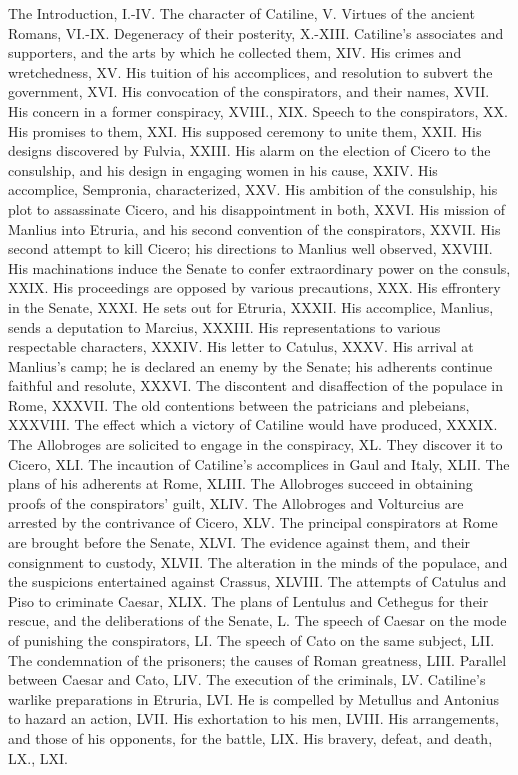 

The Introduction, I.-IV. The character of Catiline, V. Virtues of the
ancient Romans, VI.-IX. Degeneracy of their posterity, X.-XIII.
Catiline's associates and supporters, and the arts by which he
collected them, XIV. His crimes and wretchedness, XV. His tuition of
his accomplices, and resolution to subvert the government, XVI. His
convocation of the conspirators, and their names, XVII. His concern in
a former conspiracy, XVIII., XIX. Speech to the conspirators, XX. His
promises to them, XXI. His supposed ceremony to unite them, XXII. His
designs discovered by Fulvia, XXIII. His alarm on the election of
Cicero to the consulship, and his design in engaging women in his
cause, XXIV. His accomplice, Sempronia, characterized, XXV. His
ambition of the consulship, his plot to assassinate Cicero, and his
disappointment in both, XXVI. His mission of Manlius into Etruria, and
his second convention of the conspirators, XXVII. His second attempt
to kill Cicero; his directions to Manlius well observed, XXVIII. His
machinations induce the Senate to confer extraordinary power on the
consuls, XXIX. His proceedings are opposed by various precautions,
XXX. His effrontery in the Senate, XXXI. He sets out for Etruria,
XXXII. His accomplice, Manlius, sends a deputation to Marcius, XXXIII.
His representations to various respectable characters, XXXIV. His
letter to Catulus, XXXV. His arrival at Manlius's camp; he is declared
an enemy by the Senate; his adherents continue faithful and resolute,
XXXVI. The discontent and disaffection of the populace in Rome,
XXXVII. The old contentions between the patricians and plebeians,
XXXVIII. The effect which a victory of Catiline would have produced,
XXXIX. The Allobroges are solicited to engage in the conspiracy, XL.
They discover it to Cicero, XLI. The incaution of Catiline's
accomplices in Gaul and Italy, XLII. The plans of his adherents at
Rome, XLIII. The Allobroges succeed in obtaining proofs of the
conspirators' guilt, XLIV. The Allobroges and Volturcius are arrested
by the contrivance of Cicero, XLV. The principal conspirators at Rome
are brought before the Senate, XLVI. The evidence against them, and
their consignment to custody, XLVII. The alteration in the minds of
the populace, and the suspicions entertained against Crassus, XLVIII.
The attempts of Catulus and Piso to criminate Caesar, XLIX. The plans
of Lentulus and Cethegus for their rescue, and the deliberations of
the Senate, L. The speech of Caesar on the mode of punishing the
conspirators, LI. The speech of Cato on the same subject, LII. The
condemnation of the prisoners; the causes of Roman greatness, LIII.
Parallel between Caesar and Cato, LIV. The execution of the criminals,
LV. Catiline's warlike preparations in Etruria, LVI. He is compelled
by Metullus and Antonius to hazard an action, LVII. His exhortation to
his men, LVIII. His arrangements, and those of his opponents, for the
battle, LIX. His bravery, defeat, and death, LX., LXI.

